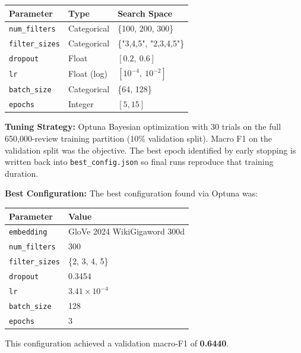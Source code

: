 \documentclass[12pt]{article}
\begin{document}
\begin{table}[H]
    \centering
    \begin{tabular}{lll}
        \toprule
        Parameter & Type & Search Space \\
        \midrule
        \texttt{num\_filters}  & Categorical & \{100, 200, 300\} \\
        \texttt{filter\_sizes} & Categorical & \{"3,4,5", "2,3,4,5"\} \\
        \texttt{dropout}       & Float       & $[0.2,\ 0.6]$ \\
        \texttt{lr}            & Float (log) & $[10^{-4},\ 10^{-2}]$ \\
        \texttt{batch\_size}   & Categorical & \{64, 128\} \\
        \texttt{epochs}        & Integer     & $[5, 15]$ \\
        \bottomrule
    \end{tabular}
\end{table}

\textbf{Tuning Strategy:} Optuna Bayesian optimization with 30 trials on the full 650,000-review training partition (10\% validation split). Macro F1 on the validation split was the objective. The best epoch identified by early stopping is written back into \texttt{best\_config.json} so final runs reproduce that training duration.

\textbf{Best Configuration:} The best configuration found via Optuna was:

\begin{table}[H]
    \centering
    \begin{tabular}{ll}
        \toprule
        Parameter & Value \\
        \midrule
        \texttt{embedding}     & GloVe 2024 WikiGigaword 300d \\
        \texttt{num\_filters}  & 300 \\
        \texttt{filter\_sizes} & \{2, 3, 4, 5\} \\
        \texttt{dropout}       & 0.3454 \\
        \texttt{lr}            & $3.41 \times 10^{-4}$ \\
        \texttt{batch\_size}   & 128 \\
        \texttt{epochs}        & 3 \\
        \bottomrule
    \end{tabular}
\end{table}

This configuration achieved a validation macro-F1 of \textbf{0.6440}.
\end{document}
